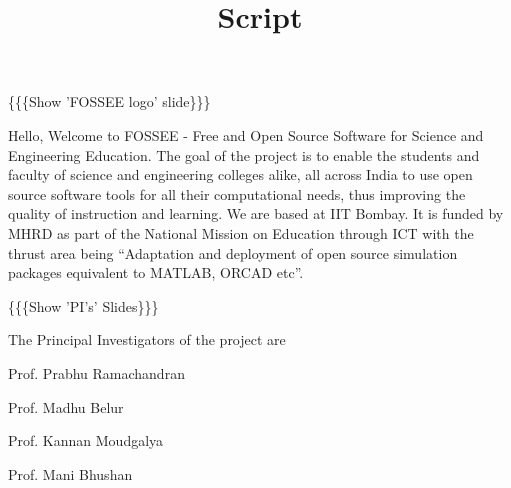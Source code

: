 \documentclass[a4paper,english]{article}
\begin{document}
\title{Script%
  \label{script}}
\author{}
\date{}
\maketitle











\{\{\{Show 'FOSSEE logo' slide\}\}\}


Hello, Welcome to FOSSEE - Free and Open Source Software for Science and Engineering Education. The goal of the project is to enable the students and faculty of science and engineering colleges alike, all across India to use open source software tools for all their computational needs, thus improving the quality of instruction and learning. We are based at IIT Bombay. It is funded by MHRD as part of the National Mission on Education through ICT with the thrust area being ``Adaptation and deployment of open source simulation packages equivalent to MATLAB, ORCAD etc''.


\{\{\{Show 'PI's' Slides\}\}\}


The Principal Investigators of the project are
\begin{list}{.}
{
\setlength{\rightmargin}{\leftmargin}
}

\item Prof. Prabhu Ramachandran

\item Prof. Madhu Belur

\item Prof. Kannan Moudgalya

\item Prof. Mani Bhushan
\end{list}
\end{document}
